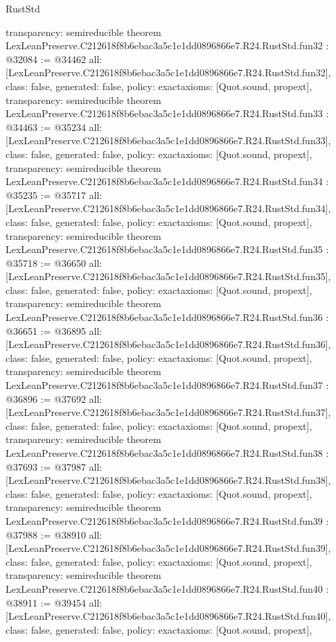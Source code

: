\begin{lexlean}{RustStd}
\begin{coremodule}
{  transparency: semireducible
}
theorem LexLeanPreserve.C212618f8b6ebac3a5c1e1dd0896866e7.R24.RustStd.fun32 : @32084 := @34462 {
  all: [LexLeanPreserve.C212618f8b6ebac3a5c1e1dd0896866e7.R24.RustStd.fun32],
  class: false,
  generated: false,
  policy: exact{axioms: [Quot.sound, propext]},
  transparency: semireducible
}
theorem LexLeanPreserve.C212618f8b6ebac3a5c1e1dd0896866e7.R24.RustStd.fun33 : @34463 := @35234 {
  all: [LexLeanPreserve.C212618f8b6ebac3a5c1e1dd0896866e7.R24.RustStd.fun33],
  class: false,
  generated: false,
  policy: exact{axioms: [Quot.sound, propext]},
  transparency: semireducible
}
theorem LexLeanPreserve.C212618f8b6ebac3a5c1e1dd0896866e7.R24.RustStd.fun34 : @35235 := @35717 {
  all: [LexLeanPreserve.C212618f8b6ebac3a5c1e1dd0896866e7.R24.RustStd.fun34],
  class: false,
  generated: false,
  policy: exact{axioms: [Quot.sound, propext]},
  transparency: semireducible
}
theorem LexLeanPreserve.C212618f8b6ebac3a5c1e1dd0896866e7.R24.RustStd.fun35 : @35718 := @36650 {
  all: [LexLeanPreserve.C212618f8b6ebac3a5c1e1dd0896866e7.R24.RustStd.fun35],
  class: false,
  generated: false,
  policy: exact{axioms: [Quot.sound, propext]},
  transparency: semireducible
}
theorem LexLeanPreserve.C212618f8b6ebac3a5c1e1dd0896866e7.R24.RustStd.fun36 : @36651 := @36895 {
  all: [LexLeanPreserve.C212618f8b6ebac3a5c1e1dd0896866e7.R24.RustStd.fun36],
  class: false,
  generated: false,
  policy: exact{axioms: [Quot.sound, propext]},
  transparency: semireducible
}
theorem LexLeanPreserve.C212618f8b6ebac3a5c1e1dd0896866e7.R24.RustStd.fun37 : @36896 := @37692 {
  all: [LexLeanPreserve.C212618f8b6ebac3a5c1e1dd0896866e7.R24.RustStd.fun37],
  class: false,
  generated: false,
  policy: exact{axioms: [Quot.sound, propext]},
  transparency: semireducible
}
theorem LexLeanPreserve.C212618f8b6ebac3a5c1e1dd0896866e7.R24.RustStd.fun38 : @37693 := @37987 {
  all: [LexLeanPreserve.C212618f8b6ebac3a5c1e1dd0896866e7.R24.RustStd.fun38],
  class: false,
  generated: false,
  policy: exact{axioms: [Quot.sound, propext]},
  transparency: semireducible
}
theorem LexLeanPreserve.C212618f8b6ebac3a5c1e1dd0896866e7.R24.RustStd.fun39 : @37988 := @38910 {
  all: [LexLeanPreserve.C212618f8b6ebac3a5c1e1dd0896866e7.R24.RustStd.fun39],
  class: false,
  generated: false,
  policy: exact{axioms: [Quot.sound, propext]},
  transparency: semireducible
}
theorem LexLeanPreserve.C212618f8b6ebac3a5c1e1dd0896866e7.R24.RustStd.fun40 : @38911 := @39454 {
  all: [LexLeanPreserve.C212618f8b6ebac3a5c1e1dd0896866e7.R24.RustStd.fun40],
  class: false,
  generated: false,
  policy: exact{axioms: [Quot.sound, propext]},
}
\end{coremodule}
\end{lexlean}

